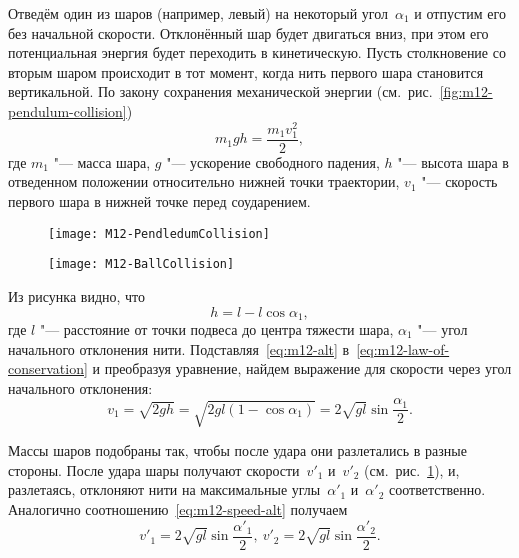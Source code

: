\documentclass[a4paper, 12pt]{extarticle}
\begin{document}
Отведём один из шаров (например, левый) на  некоторый угол~$\alpha_1$ и отпустим его без начальной скорости. Отклонённый шар будет двигаться  вниз, при этом его потенциальная энергия будет переходить в кинетическую. Пусть столкновение со вторым шаром происходит в тот момент, когда нить первого шара становится вертикальной. По закону сохранения механической энергии (см.~рис.~\ref{fig:m12-pendulum-collision}) %
\begin{equation}
\label{eq:m12-law-of-conservation}
m_1 g h = \frac{m_1 v_1^2}{2},
\end{equation}
где $m_1$ "--- масса шара, $g$ "--- ускорение свободного падения, $h$ "--- высота шара в отведенном  положении относительно нижней точки траектории, $v_1$ "--- скорость первого шара в нижней точке перед соударением. %
\begin{figure}[h]
\centering
\begin{minipage}[b]{0.45\linewidth}
\centering
\texttt{[image: M12-PendledumCollision]}
\caption{\label{fig:m12-pendulum-collision}} %
\end{minipage} \hfill
\begin{minipage}[b]{0.45\linewidth}
\centering
\texttt{[image: M12-BallCollision]}
\caption{\label{fig:m12-ball-collision}}
\end{minipage}
\end{figure}
Из рисунка видно, что
\begin{equation}
\label{eq:m12-alt}
h = l - l \cos \alpha_1,
\end{equation}
где $l$ "--- расстояние от точки подвеса до центра тяжести шара, $\alpha_1$ "--- угол начального отклонения нити. Подставляя~\eqref{eq:m12-alt} в~\eqref{eq:m12-law-of-conservation} и преобразуя уравнение, найдем выражение для скорости через угол начального отклонения: %
\begin{equation}
\label{eq:m12-speed-alt}
v_1 = \sqrt{2gh} = \sqrt{2gl(1 - \cos \alpha_1)} = 2\sqrt{gl}\sin \frac{\alpha_1}{2}.
\end{equation}

Массы шаров подобраны так, чтобы после удара они разлетались в разные стороны. После удара шары получают скорости~$v'_1$  и~$v'_2$  (см.~рис.~\ref{fig:m12-ball-collision}), и, разлетаясь, отклоняют нити на максимальные углы~$\alpha'_1$ и~$\alpha'_2$ соответственно. Аналогично соотношению~\eqref{eq:m12-speed-alt} получаем
\begin{equation}
\label{eq:m12-final-speed}
v'_1 = 2 \sqrt{gl} \sin \frac{\alpha'_1}{2}, \ v'_2 = 2 \sqrt{gl} \sin \frac{\alpha'_2}{2}.
\end{equation}
\end{document}

